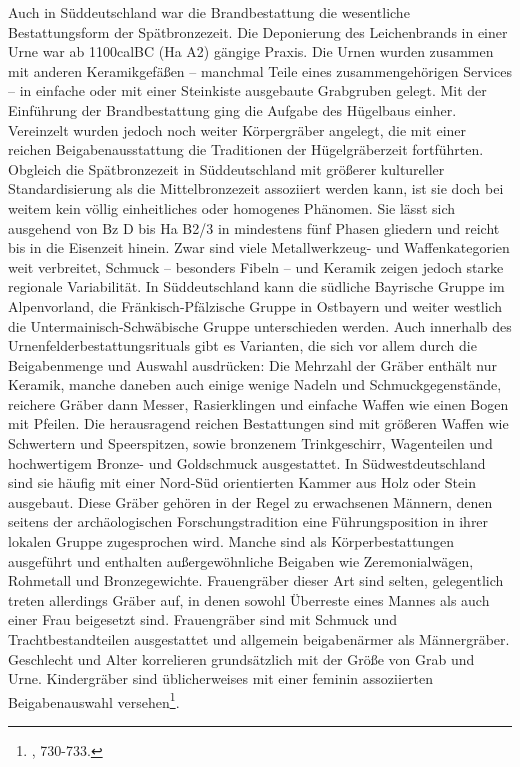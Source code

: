 \documentclass[openany,twoside,twocolumn]{book}
\let\rmarkdownfootnote\footnote%
\def\footnote{\protect\rmarkdownfootnote}
\begin{document}
Auch in Süddeutschland war die Brandbestattung die wesentliche
Bestattungsform der Spätbronzezeit. Die Deponierung des Leichenbrands in
einer Urne war ab 1100calBC (Ha A2) gängige Praxis. Die Urnen wurden
zusammen mit anderen Keramikgefäßen -- manchmal Teile eines
zusammengehörigen Services -- in einfache oder mit einer Steinkiste
ausgebaute Grabgruben gelegt. Mit der Einführung der Brandbestattung
ging die Aufgabe des Hügelbaus einher. Vereinzelt wurden jedoch noch
weiter Körpergräber angelegt, die mit einer reichen Beigabenausstattung
die Traditionen der Hügelgräberzeit fortführten. Obgleich die
Spätbronzezeit in Süddeutschland mit größerer kultureller
Standardisierung als die Mittelbronzezeit assoziiert werden kann, ist
sie doch bei weitem kein völlig einheitliches oder homogenes Phänomen.
Sie lässt sich ausgehend von Bz D bis Ha B2/3 in mindestens fünf Phasen
gliedern und reicht bis in die Eisenzeit hinein. Zwar sind viele
Metallwerkzeug- und Waffenkategorien weit verbreitet, Schmuck --
besonders Fibeln -- und Keramik zeigen jedoch starke regionale
Variabilität. In Süddeutschland kann die südliche Bayrische Gruppe im
Alpenvorland, die Fränkisch-Pfälzische Gruppe in Ostbayern und weiter
westlich die Untermainisch-Schwäbische Gruppe unterschieden werden. Auch
innerhalb des Urnenfelderbestattungsrituals gibt es Varianten, die sich
vor allem durch die Beigabenmenge und Auswahl ausdrücken: Die Mehrzahl
der Gräber enthält nur Keramik, manche daneben auch einige wenige Nadeln
und Schmuckgegenstände, reichere Gräber dann Messer, Rasierklingen und
einfache Waffen wie einen Bogen mit Pfeilen. Die herausragend reichen
Bestattungen sind mit größeren Waffen wie Schwertern und Speerspitzen,
sowie bronzenem Trinkgeschirr, Wagenteilen und hochwertigem Bronze- und
Goldschmuck ausgestattet. In Südwestdeutschland sind sie häufig mit
einer Nord-Süd orientierten Kammer aus Holz oder Stein ausgebaut. Diese
Gräber gehören in der Regel zu erwachsenen Männern, denen seitens der
archäologischen Forschungstradition eine Führungsposition in ihrer
lokalen Gruppe zugesprochen wird. Manche sind als Körperbestattungen
ausgeführt und enthalten außergewöhnliche Beigaben wie Zeremonialwägen,
Rohmetall und Bronzegewichte. Frauengräber dieser Art sind selten,
gelegentlich treten allerdings Gräber auf, in denen sowohl Überreste
eines Mannes als auch einer Frau beigesetzt sind. Frauengräber sind mit
Schmuck und Trachtbestandteilen ausgestattet und allgemein beigabenärmer
als Männergräber. Geschlecht und Alter korrelieren grundsätzlich mit der
Größe von Grab und Urne. Kindergräber sind üblicherweises mit einer
feminin assoziierten Beigabenauswahl versehen\footnote{\textcite{jockenhovel_germany_2013},
  730-733.}.
\end{document}
